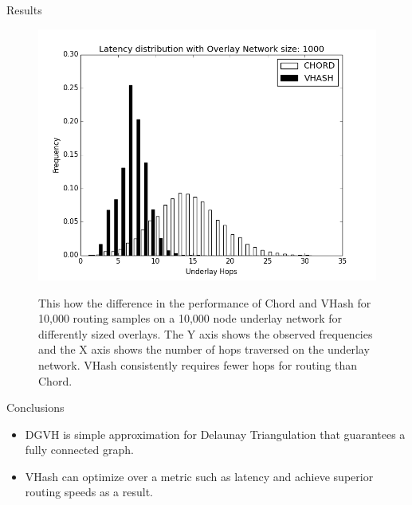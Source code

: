 \documentclass[11pt]{beamer}
\begin{document}
\begin{frame}{Results}
	\begin{figure}
		
		\centering
		\includegraphics[width=0.5\linewidth]{figs/hist_1000}
		\label{fig:hist1000}
		\caption{This how the difference in the performance of Chord and VHash for 10,000 routing samples on a 10,000 node underlay network for differently sized overlays.
			The Y axis shows the observed frequencies and the X axis shows the number of hops traversed on the underlay network.
			VHash consistently requires fewer hops for routing than Chord.}
	\end{figure}
	
\end{frame}


\begin{frame}{Conclusions}
	\begin{itemize}
		\item DGVH is simple approximation for Delaunay Triangulation that guarantees a fully connected graph.
		\item VHash can optimize over a metric such as latency and achieve superior routing speeds as a result.
	\end{itemize}
\end{frame}		

\end{document}
